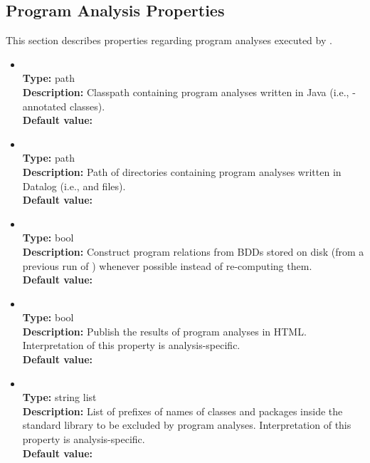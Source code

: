 \subsection{Program Analysis Properties}

This section describes properties regarding program analyses executed by \Chord.

\begin{itemize}
\item
{} \\
{\bf Type:} path \\
{\bf Description:} Classpath containing program analyses written in Java (i.e., -annotated classes). \\
{\bf Default value:}  

\item
{} \\
{\bf Type:} path \\
{\bf Description:} Path of directories containing program analyses written in Datalog (i.e.,  and  files). \\
{\bf Default value:}  

\item
{} \\
{\bf Type:} bool \\
{\bf Description:} Construct program relations from BDDs stored on disk (from a previous run of \Chord) whenever possible instead of re-computing them. \\
{\bf Default value:}  

\item
{} \\
{\bf Type:} bool \\
{\bf Description:} Publish the results of program analyses in HTML.  Interpretation of this property is analysis-specific. \\
{\bf Default value:}  

\item
{} \\
{\bf Type:} string list \\
{\bf Description:} List of prefixes of names of classes and packages inside the standard library to be excluded by program analyses.  Interpretation of this property is analysis-specific. \\
{\bf Default value:}  


\end{itemize}

